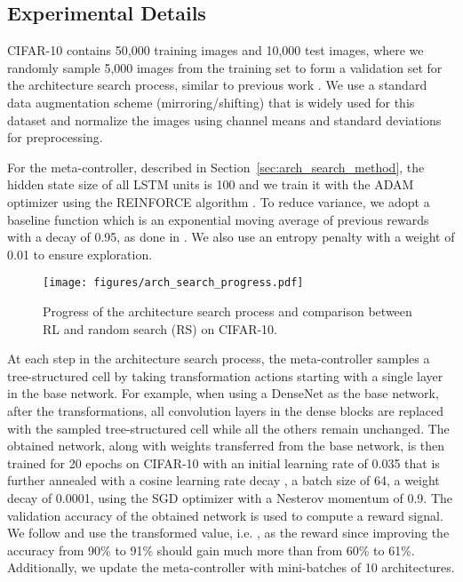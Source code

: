 \documentclass{article}
\begin{document}
\subsection{Experimental Details}
CIFAR-10 contains 50,000 training images and 10,000 test images, where we randomly sample 5,000 images from the training set to form a validation set for the architecture search process, similar to previous work \cite{zoph2017learning,cai2018efficient}. We use a standard data augmentation scheme (mirroring/shifting) that is widely used for this dataset \cite{huang2016densely,han2016deep,cai2018efficient} and normalize the images using channel means and standard deviations for preprocessing.

For the meta-controller, described in Section~\ref{sec:arch_search_method}, the hidden state size of all LSTM units is 100 and we train it with the ADAM optimizer \cite{kingma2014adam} using the REINFORCE algorithm \cite{williams1992simple}. To reduce variance, we adopt a baseline function which is an exponential moving average of previous rewards with a decay of 0.95, as done in \citet{cai2018efficient}. We also use an entropy penalty with a weight of 0.01 to ensure exploration. 

\begin{figure}[t]
	\centering
	\texttt{[image: figures/arch\_search\_progress.pdf]}
    \vspace{-10pt}
	\caption{Progress of the architecture search process and comparison between RL and random search (RS) on CIFAR-10.}\vspace{-15pt}
	\label{fig:arch_search_progress}
\end{figure}

At each step in the architecture search process, the meta-controller samples a tree-structured cell by taking transformation actions starting with a single layer in the base network. For example, when using a DenseNet as the base network, after the transformations, all  convolution layers in the dense blocks are replaced with the sampled tree-structured cell while all the others remain unchanged. The obtained network, along with weights transferred from the base network, is then trained for 20 epochs on CIFAR-10 with an initial learning rate of 0.035 that is further annealed with a cosine learning rate decay \cite{loshchilov2016sgdr}, a batch size of 64, a weight decay of 0.0001, using the SGD optimizer with a Nesterov momentum of 0.9. The validation accuracy  of the obtained network is used to compute a reward signal. We follow \citet{cai2018efficient} and use the transformed value, i.e. , as the reward since improving the accuracy from 90\% to 91\% should gain much more than from 60\% to 61\%. Additionally, we update the meta-controller with mini-batches of 10 architectures. 
 
\end{document}
